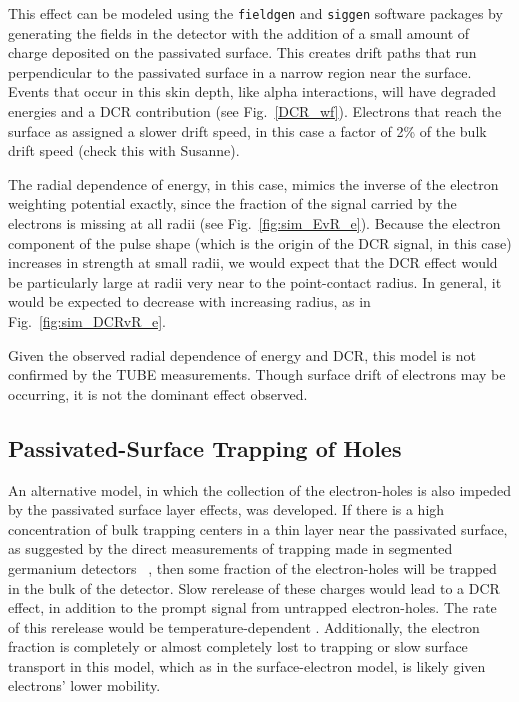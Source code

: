This effect can be modeled using the {\tt fieldgen} and {\tt siggen} software packages by generating the fields in the detector with the addition of a small amount of charge deposited on the passivated surface. This creates drift paths that run perpendicular to the passivated surface in a narrow region near the surface. Events that occur in this skin depth, like alpha interactions, will have degraded energies and a DCR contribution (see Fig.~\ref{DCR_wf}). Electrons that reach the surface as assigned a slower drift speed, in this case a factor of 2\% of the bulk drift speed (check this with Susanne). 

The radial dependence of energy, in this case, mimics the inverse of the electron weighting potential exactly, since the fraction of the signal carried by the electrons is missing at all radii (see Fig.~\ref{fig:sim_EvR_e}). Because the electron component of the pulse shape (which is the origin of the DCR signal, in this case) increases in strength at small radii, we would expect that the DCR effect would  be particularly large at radii very near to the point-contact radius. In general, it would be expected to decrease with increasing radius, as in Fig.~\ref{fig:sim_DCRvR_e}. 

Given the observed radial dependence of energy and DCR, this model is not confirmed by the TUBE measurements. Though surface drift of electrons may be occurring, it is not the dominant effect observed. 

\subsection{Passivated-Surface Trapping of Holes}
An alternative model, in which the collection of the electron-holes is also impeded by the passivated surface layer effects, was developed. If there is a high concentration of bulk trapping centers in a thin layer near the passivated surface, as suggested by the direct measurements of trapping made in segmented germanium detectors ~\cite{Abt2017}, then some fraction of the electron-holes will be trapped in the bulk of the detector. Slow rerelease of these charges would lead to a DCR effect, in addition to the prompt signal from untrapped electron-holes. The rate of this rerelease would be temperature-dependent \cite{?}. Additionally, the electron fraction is completely or almost completely lost to trapping or slow surface transport in this model, which as in the surface-electron model, is likely given electrons' lower mobility. 

